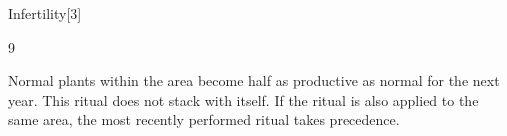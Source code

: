 \begin{spellsection}{Infertility}[3]

\begin{spellcontent}

\begin{spelltargetinginfo}


 9
\end{spelltargetinginfo}


\begin{spelleffects}



\spelleffect
Normal plants within the area become half as productive as normal for the next year.
This ritual does not stack with itself.
If the  ritual is also applied to the same area, the most recently performed ritual takes precedence.








\end{spelleffects}

\end{spellcontent}
\begin{spellfooter}


\end{spellfooter}
\begin{spellsubcontent}


\end{spellsubcontent}
\end{spellsection}


